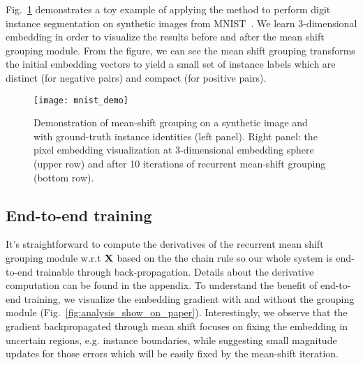 \documentclass[10pt,twocolumn,letterpaper]{article}
\def\X{{\bf X}}
\begin{document}
Fig.~\ref{fig:mnist_demo} demonstrates a toy example of applying the method to
perform digit instance segmentation on synthetic images from
MNIST~\cite{lecun1998gradient}. We learn 3-dimensional embedding in order to
visualize the results before and after the mean shift grouping module.  From
the figure, we can see the mean shift grouping transforms the initial embedding
vectors to yield a small set of instance labels which are distinct (for negative
pairs) and compact (for positive pairs).

\begin{figure}[t]
\centering
   \texttt{[image: mnist\_demo]}
   \vspace{-2mm}
   \caption{Demonstration of mean-shift grouping on a synthetic image and with
   ground-truth instance identities (left panel).  Right panel: the pixel
   embedding visualization at 3-dimensional embedding sphere (upper row) and
   after 10 iterations of recurrent mean-shift grouping (bottom row).
   }
   \vspace{-3mm}
\label{fig:mnist_demo}
\end{figure}\subsection{End-to-end training}
It's straightforward to compute the derivatives of the recurrent mean shift
grouping module w.r.t $\X$ based on the the chain rule so our whole system is
end-to-end trainable through back-propagation.  Details about the derivative
computation can be found in the appendix.  To understand the benefit
of end-to-end training, we visualize the embedding gradient with and without
the grouping module (Fig.~\ref{fig:analysis_show_on_paper}).  Interestingly, we
observe that the gradient backpropagated through mean shift focuses on fixing
the embedding in uncertain regions, e.g.  instance boundaries, while suggesting
small magnitude updates for those errors which will be easily fixed by the
mean-shift iteration.
\end{document}
